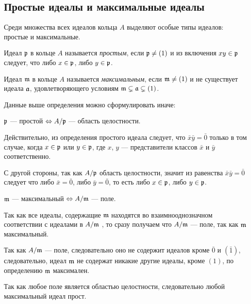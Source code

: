     \subsection{Простые идеалы и максимальные идеалы}
    Среди множества всех идеалов кольца $A$ выделяют особые типы идеалов: простые и максимальные.
    \begin{Def}
        Идеал $\mathfrak{p}$ в кольце $A$ называется \textit{простым}, если $\mathfrak{p} \neq (1)$ и из включения $xy \in \mathfrak{p}$ следует, что либо $x \in \mathfrak{p}$, либо $y \in \mathfrak{p}$.
    \end{Def}
    \begin{Def}
        Идеал $\mathfrak{m}$ в кольце $A$ называется \textit{максимальным}, если $\mathfrak{m} \neq (1)$ и не существует идеала $\mathfrak{a}$, удовлетворяющего условиям $\mathfrak{m} \subsetneq \mathfrak{a} \subsetneq (1)$.
    \end{Def}

    Данные выше определения можно сформулировать иначе:
    \begin{center}
        $\mathfrak{p}$ --- простой $\Leftrightarrow A/\mathfrak{p}$ --- область целостности. 
    \end{center}

    Действительно, из определения простого идеала следует, что $\bar{x}\bar{y} = \bar{0}$ только в том случае,
    когда $x \in \mathfrak{p}$ или $y \in \mathfrak{p}$, где $x$, $y$ --- представители классов $\bar{x}$ и $\bar{y}$ соответственно.

    С другой стороны, так как $A/\mathfrak{p}$ область целостности, значит из равенства $\bar{x}\bar{y} = \bar{0}$ следует что
    либо $\bar{x} = \bar{0}$, либо $\bar{y} = \bar{0}$, то есть либо $x \in \mathfrak{p}$, либо $y \in \mathfrak{p}$.

    \begin{center}
        $\mathfrak{m}$ --- максимальный $\Leftrightarrow A/\mathfrak{m}$ --- поле.
    \end{center}

    Так как все идеалы, содержащие $\mathfrak{m}$ находятся во взаимнооднозначном соответствии с идеалами в $A/\mathfrak{m}$ \cite{A-M}, 
    то сразу получаем что $A/\mathfrak{m}$ --- поле, так как $\mathfrak{m}$ максимальный. 

    Так как $A/\mathfrak{m}$ --- поле, следовательно оно не содержит идеалов кроме $\bar{0}$ и $(\bar{1})$, следовательно,
    идеал $\mathfrak{m}$ не содержат никакие другие идеалы, кроме $(1)$, по определению $\mathfrak{m}$ максимален.

    Так как любое поле является областью целостности, следовательно любой максимальный идеал прост.

